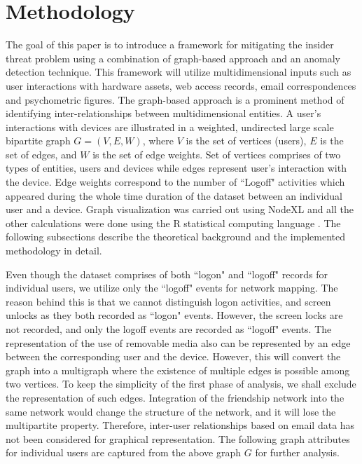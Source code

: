 \documentclass[conference,draftclsnofoot,onecolumn]{IEEEtran}%
\begin{document}
\section{Methodology}
The goal of this paper is to introduce a framework for mitigating the insider threat problem using a combination of graph-based approach and an anomaly detection technique. This framework will utilize multidimensional inputs such as user interactions with hardware assets, web access records, email correspondences and psychometric figures. The graph-based approach is a prominent method of identifying inter-relationships between multidimensional entities. A user's interactions with devices are illustrated in a weighted, undirected large scale bipartite graph $G=(V,E,W)$, where $V$ is the set of vertices (users), $E$ is the set of edges, and $W$ is the set of edge weights. Set of vertices comprises of two types of entities, users and devices while edges represent user's interaction with the device. Edge weights correspond to the number of ``Logoff" activities which appeared during the whole time duration of the dataset between an individual user and a device. Graph visualization was carried out using NodeXL \cite{NodeXL} and all the other calculations were done using the R statistical computing language \cite{R}. The following subsections describe the theoretical background and the implemented methodology in detail.

Even though the dataset comprises of both ``logon" and ``logoff" records for individual users, we utilize only the ``logoff" events for network mapping. The reason behind this is that we cannot distinguish logon activities, and screen unlocks as they both recorded as ``logon" events. However, the screen locks are not recorded, and only the logoff events are recorded as ``logoff" events. The representation of the use of removable media also can be represented by an edge between the corresponding user and the device. However, this will convert the graph into a multigraph where the existence of multiple edges is possible among two vertices. To keep the simplicity of the first phase of analysis, we shall exclude the representation of such edges. Integration of the friendship network into the same network would change the structure of the network, and it will lose the multipartite property. Therefore, inter-user relationships based on email data has not been considered for graphical representation. The following graph attributes for individual users are captured from the above graph $G$ for further analysis. 
\end{document}
